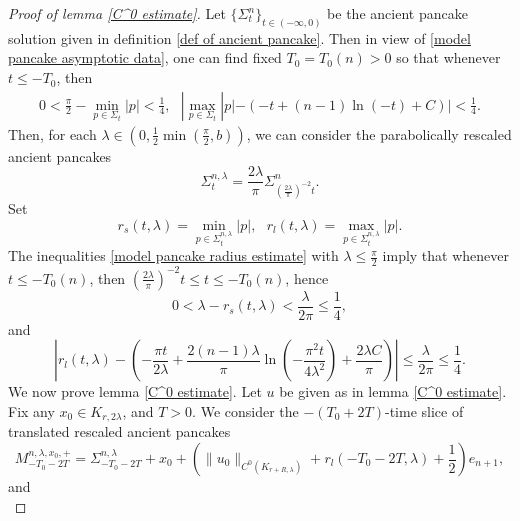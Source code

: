 \documentclass[pdflatex,sn-mathphys-num]{sn-jnl}%
\begin{document}
\begin{proof}[Proof of lemma \ref{C^0 estimate}]
Let $\{\Sigma^n_t\}_{t\in(-\infty, 0)}$ be the ancient pancake solution given in definition \ref{def of ancient pancake}. Then in view of \eqref{model pancake asymptotic data}, one can find fixed $T_0 = T_0(n) > 0$ so that whenever $t \leq -T_0$, then
\begin{align}\label{model pancake radius estimate}
     0 < \frac{\pi}{2}- \min_{p \in \Sigma_t}|p| < \frac{1}{4} , \ \ \ |\max_{p \in \Sigma_t}|p| - (-t + (n-1)\ln(-t) + C)| < \frac{1}{4}.
\end{align}
Then, for each $\lambda \in (0,\frac{1}{2}\min(\frac{\pi}{2}, b))$, we can consider the parabolically rescaled ancient pancakes
\begin{equation}\label{definition of rescaled ancient pancakes}
    \Sigma^{n, \lambda}_t = \frac{2\lambda}{\pi} \Sigma^n_{(\frac{2\lambda}{\pi})^{-2}t}.
\end{equation}
Set 
\begin{equation}\label{def of long and short radius}
    r_s(t,\lambda) = \min_{p \in \Sigma^{n, \lambda}_t}|p|, \ \ \ r_l(t, \lambda) =  \max_{p \in \Sigma^{n, \lambda}_t}|p|.
\end{equation}
The inequalities \eqref{model pancake radius estimate} with $\lambda \leq \frac{\pi}{2}$ imply that whenever $t \leq -T_0(n)$, then $(\frac{2\lambda}{\pi})^{-2}t \leq t \leq -T_0(n)$, hence
\begin{equation}\label{short radius estimate for rescaled ancient pancakes}
    0 < \lambda - r_s(t,\lambda)   < \frac{\lambda}{2\pi} \leq \frac{1}{4},
\end{equation}
and
\begin{equation}\label{long radius estimate for rescaled ancient pancakes}
    |r_l(t, \lambda) - (-\frac{\pi t}{2\lambda}+ \frac{2(n-1)\lambda}{\pi}\ln(-\frac{\pi^2t}{4\lambda^2}) + \frac{2\lambda C}{\pi})| \leq \frac{\lambda}{2\pi} \leq \frac{1}{4}.
\end{equation}
We now prove lemma \ref{C^0 estimate}. Let $u$ be given as in lemma \ref{C^0 estimate}. Fix any $x_0 \in K_{ r, 2\lambda}$, and $T > 0$. We consider the $-(T_0 + 2T)$-time slice of translated rescaled ancient pancakes
\begin{equation}\label{def of upper barriers}
    M^{n, \lambda, x_0, +}_{-T_0 - 2T } = \Sigma^{n, \lambda}_{-T_0 -2T}  + x_0 + (\|u_0\|_{C^0(K_{ r + R, \lambda})} + r_l(-T_0-2T, \lambda) + \frac{1}{2})e_{n+1},
\end{equation}
and
\begin{equation}\label{def of lower barriers}

\end{equation}
\end{proof}
\end{document}
